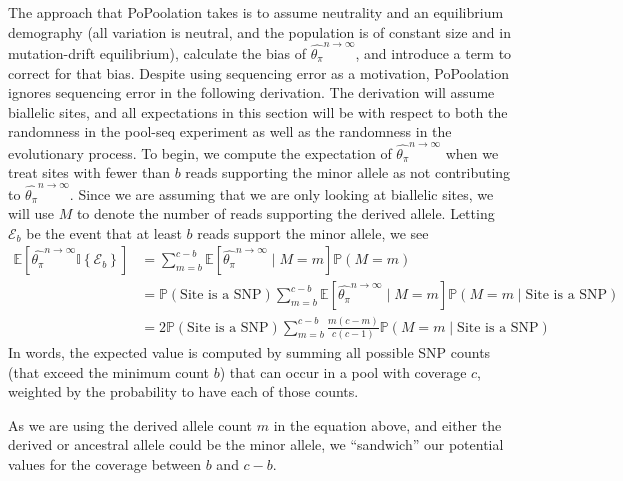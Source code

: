 \documentclass[a4paper,fontsize=9pt,DIV=14]{scrartcl}
\newcommand{\samplesize}{n}
\newcommand{\coverage}{c}
\newcommand{\thetapi}{\widehat{\theta_\pi}}
\begin{document}
The approach that PoPoolation takes is to assume neutrality and an equilibrium demography (all variation is neutral, and the population is of constant size and in mutation-drift equilibrium), calculate the bias of $\thetapi^{\samplesize\to\infty}$, and introduce a term to correct for that bias.  Despite using sequencing error as a motivation, PoPoolation ignores sequencing error in the following derivation.  The derivation will assume biallelic sites, and all expectations in this section will be with respect to both the randomness in the pool-seq experiment as well as the randomness in the evolutionary process.  To begin, we compute the expectation of $\thetapi^{\samplesize\to\infty}$ when we treat sites with fewer than $b$ reads supporting the minor allele as not contributing to $\thetapi^{\samplesize\to\infty}$.  Since we are assuming that we are only looking at biallelic sites, we will use $M$ to denote the number of reads supporting the derived allele.  Letting $\mathcal{E}_b$ be the event that at least $b$ reads support the minor allele, we see
%
\begin{align}
\mathbb{E}\left[\thetapi^{\samplesize\to\infty} \mathbb{I}\left\{\mathcal{E}_b\right\}\right] &= \sum_{m=b}^{\coverage-b} \mathbb{E}\left[\thetapi^{\samplesize\to\infty} \mid M=m \right] \mathbb{P}(M = m)\\
&= \mathbb{P}\left(\text{Site is a SNP}\right)\sum_{m=b}^{\coverage-b} \mathbb{E}\left[\thetapi^{\samplesize\to\infty} \mid M=m \right] \mathbb{P}\left(M = m \mid \text{Site is a SNP}\right)\\
&=  2\mathbb{P}\left(\text{Site is a SNP}\right)\sum_{m=b}^{\coverage-b} \frac{m(\coverage-m)}{\coverage(\coverage-1)} \mathbb{P}\left(M = m \mid \text{Site is a SNP}\right)
\label{eq:ExpectationThetaPi}
\end{align}
%
In words, the expected value is computed by summing all possible SNP counts (that exceed the minimum count $b$)
that can occur in a pool with coverage $\coverage$,
weighted by the probability to have each of those counts.

As we are using the derived allele count $m$ in the equation above,
and either the derived or ancestral allele could be the minor allele,
we ``sandwich'' our potential values for the coverage between $b$ and $\coverage-b$.
\end{document}
